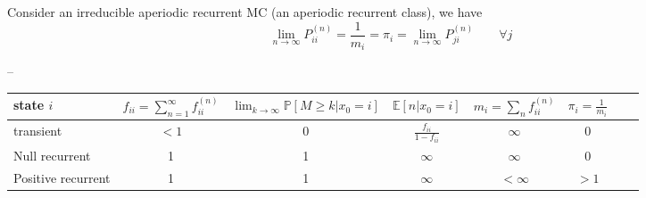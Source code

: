 \begin{theorem}
Consider an irreducible aperiodic recurrent MC (an aperiodic recurrent class), we have
$$ \lim_{n\to \infty} P_{ii}^{(n)} = \frac{1}{m_i} = \pi_i = \lim_{n\to\infty} P_{ji}^{(n)} \qquad \forall j$$
\end{theorem}
--

\begin{center}
    \begin{tabular}{|l*{6}{|c}r}
        \hline
    state $i$ & $f_{ii} = \sum_{n=1}^\infty f_{ii}^{(n)}$  & $\lim_{k \to \infty } \mathbb{P}[M \geq k | x_0=i]$ & $\mathbb{E}[n|x_0=i]$ & $m_i = \sum_n f_{ii}^{(n)}$ & $\pi_i = \frac{1}{m_i}$  \\ \hline

    transient & $<1$ & 0 & $\frac{f_{ii}}{1-f_{ii}}$ & $\infty$ & 0 \\ \hline
    Null recurrent & 1 & 1 & $\infty$ & $\infty$ & 0 \\ \hline
    Positive recurrent & 1 & 1 & $\infty$ & $<\infty$ & $>1$ \\ \hline
        \end{tabular}
\end{center}


